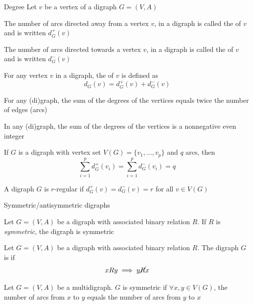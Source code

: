 \documentclass[aspectratio=169]{beamer}\usepackage[]{graphicx}\usepackage[]{xcolor}
\begin{document}
\begin{frame}{Degree}
	Let $v$ be a vertex of a digraph $G=(V,A)$
	\begin{definition}
	The number of arcs directed away from a vertex $v$, in a digraph is called the  of $v$ and is written $d^+_G(v)$
	\end{definition}
	\begin{definition}
	The number of arcs directed towards a vertex $v$, in a digraph is called the  of $v$ and is written $d^-_G(v)$
	\end{definition}
	\begin{definition}[{Degree}]
	For any vertex $v$ in a digraph, the  of $v$ is defined as 
	\[
		d_G(v)=d^+_G(v)+d^-_G(v)
	\]
	\end{definition}
\end{frame}



\begin{frame}
	\begin{theorem}
		For any (di)graph, the sum of the degrees of the vertices equals twice the number of edges (arcs)
	\end{theorem}
	\begin{corollary}
		In any (di)graph, the sum of the degrees of the vertices is a nonnegative even integer
	\end{corollary}
	\begin{theorem}
		If $G$ is a digraph with vertex set $V(G)=\{v_1, \dots , v_p\}$ and $q$ arcs, then $$\sum_{i=1}^p d^+_G(v_i)=\sum_{i=1}^p d^-_G(v_i)=q$$
	\end{theorem}
\end{frame}

\begin{frame}
	\begin{definition}
		A digraph $G$ is $r$-regular if $d_G^+(v)=d_G^-(v)=r$ for all $v\in V(G)$
\end{definition}\end{frame}

\begin{frame}{Symmetric/antisymmetric digraphs}
	\begin{definition}
		Let $G=(V,A)$ be a digraph with associated binary relation $R$.
		If $R$ is \emph{symmetric}, the digraph is symmetric
	\end{definition}
	\vfill
	\begin{definition}
		Let $G=(V,A)$ be a digraph with associated binary relation $R$.
		The digraph $G$ is  if
		\[
		xRy \implies y\cancel R x
		\]
	\end{definition}
	\vfill
	\begin{definition}
		Let $G=(V,A)$ be a multidigraph. $G$ is symmetric if $\forall x,y\in V(G)$, the number of arcs from $x$ to $y$ equals the number of arcs from $y$ to $x$
	\end{definition}
\end{frame}
\end{document}
